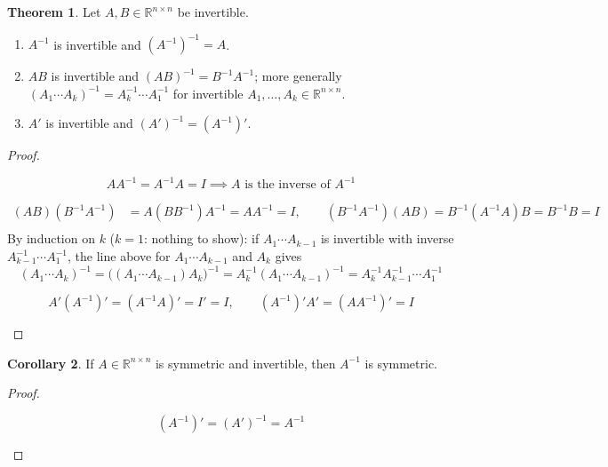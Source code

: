 \documentclass[12pt]{article}
\newcommand{\R}{\mathbb R}
\theoremstyle{definition}
\newtheorem{theorem}{Theorem}
\newtheorem{corollary}[theorem]{Corollary}
\newcommand{\boardtop}{\vspace*{-\abovedisplayskip}}
\begin{document}
\begin{theorem}\label{b2.13}
Let \(A,B\in\R^{n\times n}\) be invertible.
\begin{enumerate}
\item \(A^{-1}\) is invertible and \((A^{-1})^{-1}=A\).
\item \(AB\) is invertible and \((AB)^{-1}=B^{-1}A^{-1}\); more generally \((A_1\cdots A_k)^{-1}=A_k^{-1}\cdots A_1^{-1}\)
for invertible \(A_1,\dots,A_k\in\R^{n\times n}\).
\item \(A'\) is invertible and \((A')^{-1}=(A^{-1})'\).
\end{enumerate}
\end{theorem}
\begin{proof}
\begin{board}
\[
AA^{-1}=A^{-1}A=I\implies A\text{ is the inverse of }A^{-1}
\]
\end{board}
\begin{board}
\boardtop
\begin{align*}
(AB)(B^{-1}A^{-1})&=A(BB^{-1})A^{-1}=AA^{-1}=I,\qquad(B^{-1}A^{-1})(AB)=B^{-1}(A^{-1}A)B=B^{-1}B=I\\
\end{align*}
By induction on \(k\) (\(k=1\): nothing to show): if \(A_1\cdots A_{k-1}\) is invertible with inverse
\(A_{k-1}^{-1}\cdots A_1^{-1}\), the line above for \(A_1\cdots A_{k-1}\) and \(A_k\) gives
\[
(A_1\cdots A_k)^{-1}=\bigl((A_1\cdots A_{k-1})A_k\bigr)^{-1}=A_k^{-1}(A_1\cdots A_{k-1})^{-1}=A_k^{-1}A_{k-1}^{-1}\cdots A_1^{-1}
\]
\end{board}
\begin{board}[(c) \((AB)'=B'A'\), \(I'=I\) (\lec{1}, \lit{Theorem~8}):]
\[
A'(A^{-1})'=(A^{-1}A)'=I'=I,\qquad(A^{-1})'A'=(AA^{-1})'=I
\]
\end{board}
\nopagebreak
\end{proof}

\begin{corollary}\label{b2.23}
If \(A\in\R^{n\times n}\) is symmetric and invertible, then \(A^{-1}\) is symmetric.
\end{corollary}
\begin{proof}
\begin{board}[\(A'=A\) (\lec{1}, \lit{Definition~7}); Theorem~\ref{b2.13}(c):]
\[
(A^{-1})'=(A')^{-1}=A^{-1}
\]
\end{board}
\nopagebreak
\end{proof}
\end{document}
